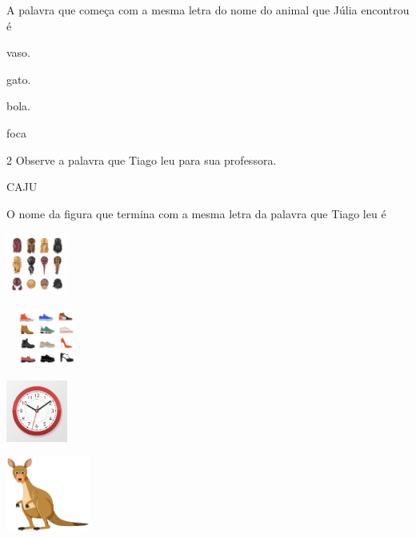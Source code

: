 A palavra que começa com a mesma letra do nome do animal que Júlia encontrou é

\begin{escolha}
\item vaso.

\item gato.

\item bola.

\item foca
\end{escolha}


\num{2} Observe a palavra que Tiago leu para sua professora.

\begin{myquote}
CAJU
\end{myquote}

O nome da figura que termina com a mesma letra da palavra que Tiago leu é

\begin{escolha}
\item\includegraphics[width=0.79792in,height=0.81667in]{media/image44.jpeg}

\item\includegraphics[width=1.02847in,height=0.72292in]{media/image45.jpeg}

\item\includegraphics[width=0.79792in,height=0.79931in]{media/image46.jpeg}

\item\includegraphics[width=1.08611in,height=0.97222in]{media/image47.jpeg}
\end{escolha}


